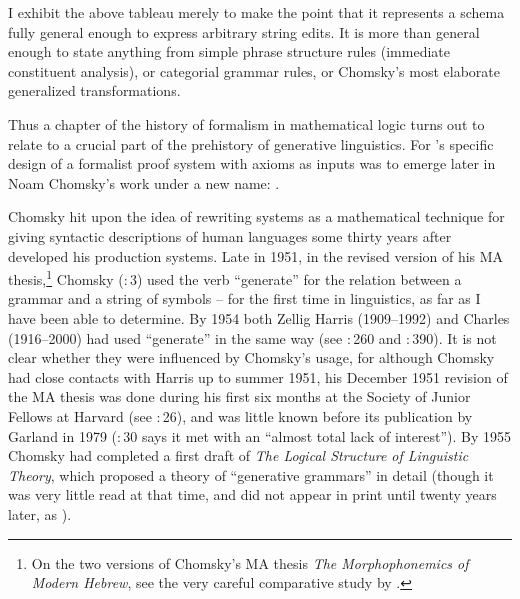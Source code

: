 \documentclass[output=paper]{langscibook}
\begin{document}
I exhibit the above tableau merely to make the point that it represents a schema fully general enough to express arbitrary string edits. It is more than general enough to state anything from simple phrase structure rules (immediate constituent analysis), or categorial grammar rules, or Chomsky's most elaborate generalized transformations.

Thus a chapter of the history of formalism in mathematical logic turns out to relate to a crucial part of the prehistory of generative linguistics. For {\Post}'s specific design of a formalist proof system with axioms as inputs was to emerge later in Noam Chomsky's work under a new name: .

Chomsky hit upon the idea of rewriting systems as a mathematical technique for giving syntactic descriptions of human languages some thirty years after {\Post} developed his production systems.  Late in 1951, in the revised version of his MA thesis,\footnote{On the two versions of Chomsky's MA thesis \textit{The Morphophonemics of Modern Hebrew}, see the very careful comparative study by \citet{Daniels10}.} Chomsky (\citeyear{Chomsky51b}:\,3) used the verb ``generate'' for the relation between a grammar and a string of symbols -- for the first time in linguistics, as far as I have been able to determine.  By 1954 both Zellig Harris (1909--1992) and Charles {\Hockett} (1916--2000) had used ``generate'' in the same way (see \citealt{Harris54transfer}:\,260 and \citealt{Hockett54}:\,390). It is not clear whether they were influenced by Chomsky's usage, for although Chomsky had close contacts with Harris up to summer 1951, his December 1951 revision of the MA thesis was done during his first six months at the Society of Junior Fellows at Harvard (see \citealt{Chomsky75LSLT}:\,26), and was little known before its publication by Garland in 1979 (\citealt{Chomsky75LSLT}:\,30 says it met with an ``almost total lack of interest''). By 1955 \nocite{Chomsky55LSLT} Chomsky had completed a first draft of \textit{The Logical Structure of Linguistic Theory}, which proposed a theory of ``generative grammars'' in detail (though it was very little read at that time, and did not appear in print until twenty years later, as \citealt{Chomsky75LSLT}).
\end{document}

